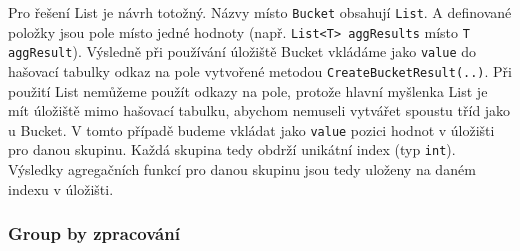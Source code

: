 Pro řešení List je návrh totožný.
Názvy místo \texttt{Bucket} obsahují \texttt{List}.
A definované položky jsou pole místo jedné hodnoty (např. \texttt{List<T> aggResults} místo \texttt{T aggResult}).
Výsledně při používání úložiště Bucket vkládáme jako \texttt{value} do hašovací tabulky odkaz na pole vytvořené metodou \texttt{CreateBucketResult(..)}.
Při použití List nemůžeme použít odkazy na pole, protože hlavní myšlenka List je mít úložiště mimo hašovací tabulku, abychom nemuseli vytvářet spoustu tříd jako u Bucket.
V tomto případě budeme vkládat jako \texttt{value} pozici hodnot v úložišti pro danou skupinu.
Každá skupina tedy obdrží unikátní index (typ \texttt{int}).
Výsledky agregačních funkcí pro danou skupinu jsou tedy uloženy na daném indexu v úložišti.

\subsubsection{Group by zpracování}

